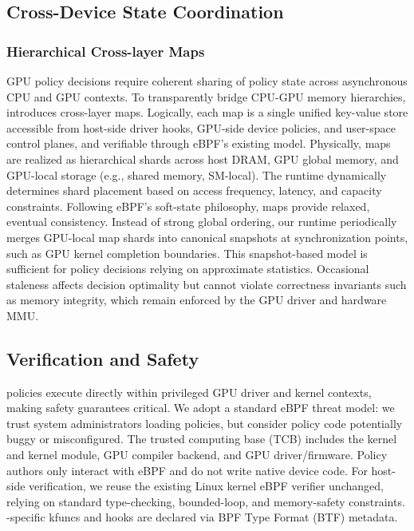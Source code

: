 
\subsection{Cross-Device State Coordination}

\subsubsection{Hierarchical Cross-layer Maps}

GPU policy decisions require coherent sharing of policy state across asynchronous CPU and GPU contexts. To transparently bridge CPU-GPU memory hierarchies, \sys introduces cross-layer maps. Logically, each map is a single unified key-value store accessible from host-side driver hooks, GPU-side device policies, and user-space control planes, and verifiable through eBPF's existing model. Physically, maps are realized as hierarchical shards across host DRAM, GPU global memory, and GPU-local storage (e.g., shared memory, SM-local). The runtime dynamically determines shard placement based on access frequency, latency, and capacity constraints. Following eBPF's soft-state philosophy, \sys maps provide relaxed, eventual consistency. Instead of strong global ordering, our runtime periodically merges GPU-local map shards into canonical snapshots at synchronization points, such as GPU kernel completion boundaries. This snapshot-based model is sufficient for policy decisions relying on approximate statistics. Occasional staleness affects decision optimality but cannot violate correctness invariants such as memory integrity, which remain enforced by the GPU driver and hardware MMU.


\subsection{Verification and Safety}
\label{sec:verification}

\sys policies execute directly within privileged GPU driver and kernel contexts, making safety guarantees critical. We adopt a standard eBPF threat model: we trust system administrators loading policies, but consider policy code potentially buggy or misconfigured. The trusted computing base (TCB) includes the kernel and \sys kernel module, GPU compiler backend, and GPU driver/firmware. Policy authors only interact with eBPF and do not write native device code. For host-side verification, we reuse the existing Linux kernel eBPF verifier unchanged, relying on standard type-checking, bounded-loop, and memory-safety constraints. \sys-specific kfuncs and hooks are declared via BPF Type Format (BTF) metadata.


